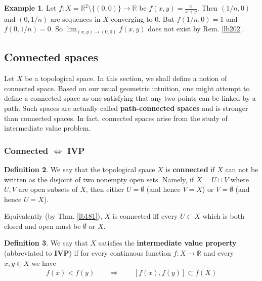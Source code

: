 \documentclass[12pt,b5paper,notitlepage]{article}
\theoremstyle{definition}
\newtheorem{df}{Definition}[section]
\newtheorem{eg}[df]{Example}
\theoremstyle{plain}
\newcommand{\Rbb}{\mathbb R}
\numberwithin{equation}{section}
\begin{document}
\begin{eg}
Let $f:X=\Rbb^2\setminus\{(0,0)\}\rightarrow \Rbb$ be $f(x,y)=\frac{x}{x+y}$. Then $(1/n,0)$ and $(0,1/n)$ are sequences in $X$ converging to $0$. But $f(1/n,0)=1$ and $f(0,1/n)=0$. So $\lim_{(x,y)\rightarrow(0,0)}f(x,y)$ does not exist by Rem. \ref{lb202}.
\end{eg}
















\subsection{Connected spaces}

Let $X$ be a topological space. In this section, we shall define a notion of connected space. Based on our usual geometric intuition, one might attempt to define a connected space as one satisfying that any two points can be linked by a path. Such spaces are actually called \textbf{path-connected spaces} and is stronger than connected spaces. In fact, connected spaces arise from the study of intermediate value problem.

\subsubsection{Connected $\Leftrightarrow$ IVP}

\begin{df}\label{lb212}
We say that the topological space $X$ is \textbf{connected}  if $X$ can not be written as the disjoint of two nonempty open sets. Namely, if $X=U\sqcup V$ where $U,V$ are open subsets of $X$, then either $U=\emptyset$ (and hence $V=X$) or $V=\emptyset$ (and hence $U=X$).
\end{df}

Equivalently (by Thm. \ref{lb181}), $X$ is connected iff every $U\subset X$ which is both closed and open must be $\emptyset$ or $X$.


\begin{df}
We say that $X$ satisfies the \textbf{intermediate value property} (abbreviated to \textbf{IVP})  if for every continuous function $f:X\rightarrow\Rbb$ and every $x,y\in X$ we have
\begin{align}
f(x)<f(y)\qquad\Longrightarrow\qquad [f(x),f(y)]\subset f(X)  \label{eq67}
\end{align}
\end{df}
\end{document}
